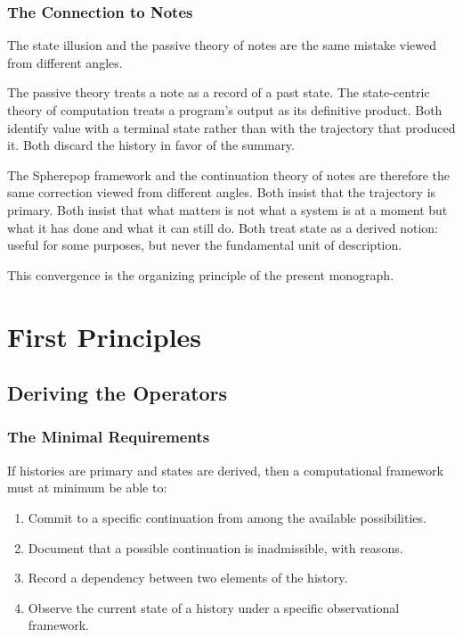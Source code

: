 \documentclass[12pt, a4paper, openany]{book}
\theoremstyle{plain}
\theoremstyle{definition}
\theoremstyle{remark}
\begin{document}
\section{The Connection to Notes}

The state illusion and the passive theory of notes are the same mistake viewed from
different angles.

The passive theory treats a note as a record of a past state. The state-centric
theory of computation treats a program's output as its definitive product. Both
identify value with a terminal state rather than with the trajectory that produced
it. Both discard the history in favor of the summary.

The Spherepop framework and the continuation theory of notes are therefore the
same correction viewed from different angles. Both insist that the trajectory is
primary. Both insist that what matters is not what a system is at a moment but
what it has done and what it can still do. Both treat state as a derived notion:
useful for some purposes, but never the fundamental unit of description.

This convergence is the organizing principle of the present monograph.

\part{First Principles}

\chapter{Deriving the Operators}

\section{The Minimal Requirements}

If histories are primary and states are derived, then a computational framework
must at minimum be able to:

\begin{enumerate}
\item Commit to a specific continuation from among the available possibilities.
\item Document that a possible continuation is inadmissible, with reasons.
\item Record a dependency between two elements of the history.
\item Observe the current state of a history under a specific observational framework.
\end{enumerate}
\end{document}
